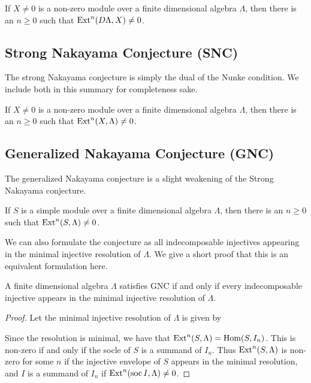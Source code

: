 \begin{conj} 
	If $X \neq 0$ is a non-zero module over a finite dimensional algebra $\Lambda$, then there is an $n \geq 0$ such that $\operatorname{Ext}^n(D\Lambda, X) \neq 0$. 
\end{conj}

\subsection*{Strong Nakayama Conjecture (SNC)}
The strong Nakayama conjecture is simply the dual of the Nunke condition. We include both in this summary for completeness sake.

\begin{conj} 
	If $X \neq 0$ is a non-zero module over a finite dimensional algebra $\Lambda$, then there is an $n \geq 0$ such that $\operatorname{Ext}^n(X,\Lambda) \neq 0$. 
\end{conj}

\subsection*{Generalized Nakayama Conjecture (GNC)}
The generalized Nakayama conjecture is a slight weakening of the Strong Nakayama conjecture.

\begin{conj} 
	If $S$ is a simple module over a finite dimensional algebra $\Lambda$, then there is an $n \geq 0$ such that $\operatorname{Ext}^n(S, \Lambda) \neq 0$. 
\end{conj}

We can also formulate the conjecture as all indecomposable injectives appearing in the minimal injective resolution of $\Lambda$. We give a short proof that this is an equivalent formulation here.

\begin{prop}\label{prop:GNC_reformulated}
	A finite dimensional algebra $\Lambda$ satisfies GNC if and only if every indecomposable injective appears in the minimal injective resolution of $\Lambda$.
	\begin{proof}
		Let the minimal injective resolution of $\Lambda$ is given by 
		\begin{center}
		\end{center}
		Since the resolution is minimal, we have that $\operatorname{Ext}^n(S, \Lambda) = \operatorname{Hom}(S, I_n)$. This is non-zero if and only if the socle of $S$ is a summand of $I_n$. Thus $\operatorname{Ext}^n(S, \Lambda)$ is non-zero for some $n$ if the injective envelope of $S$ appears in the minimal resolution, and $I$ is a summand of $I_n$ if $\operatorname{Ext}^n(\operatorname{soc}I, \Lambda) \neq 0$.
	\end{proof}
\end{prop}

